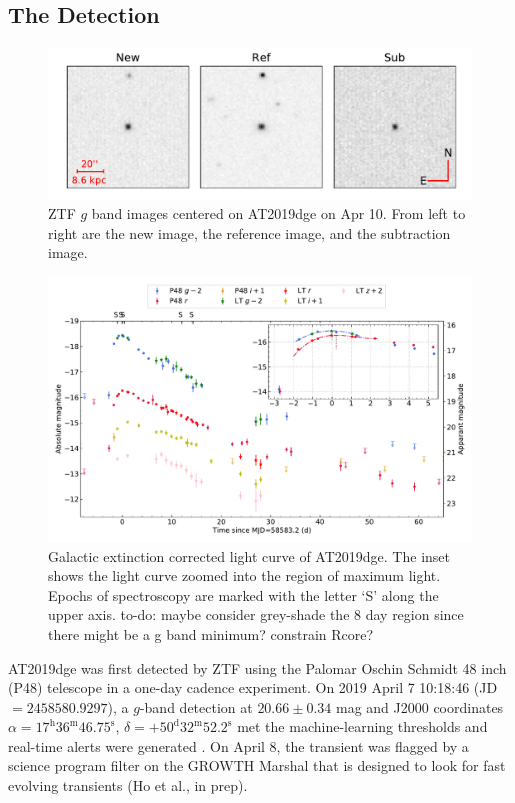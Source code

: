 \documentclass[twocolumn]{aastex63}
\newcommand{\todo}[1]{{\color{magenta} to-do: {#1}}}
\begin{document}
\begin{CJK*}{UTF8}{gbsn}
\subsection{The Detection}
\begin{figure}[htbp!]
    \centering
    \includegraphics[width=\columnwidth]{figures/detection.pdf}
    \caption{ZTF $g$ band images centered on AT2019dge on Apr 10. From left to right are the new 
    image, the reference image, and the subtraction image. \ \label{fig:detection}}
\end{figure}
\begin{figure}[htbp!]
	\centering
	\includegraphics[width=\textwidth]{figures/lightcurve.pdf}
	\caption{Galactic extinction corrected light curve of AT2019dge. The inset shows 
		the light curve zoomed into the region of maximum light. Epochs of spectroscopy are marked with 
		the letter `S' along the upper axis.
		\todo{maybe consider grey-shade the 8 day region since there might be a g band minimum? 
		constrain Rcore?} \label{fig:lightcurve}}
\end{figure}
AT2019dge was first detected by ZTF using the Palomar Oschin Schmidt 48 inch (P48) telescope in a 
one-day cadence experiment. On 2019 April 7 10:18:46 (JD 
$=2458580.9297$), a $g$-band detection at $20.66\pm0.34$ mag and J2000 coordinates $\alpha = 
17^{\mathrm{h}}36^{\mathrm{m}}46.75^{\mathrm{s}}$, $\delta = 
+50^{\mathrm{d}}32^{\mathrm{m}}52.2^{\mathrm{s}}$
met the machine-learning thresholds \citep{Mahabal2019} and real-time alerts were generated 
\citep{Patterson2019}. On April 8, the 
transient was flagged by a science program filter on the GROWTH Marshal \citep{Kasliwal2019} that is 
designed to look for fast evolving transients (Ho et al., in prep). 


\end{CJK*}
\end{document}
